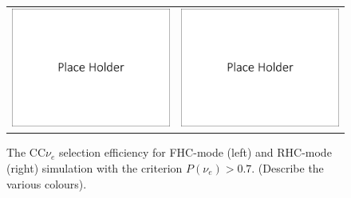 \begin{figure}
    \centering
    \begin{tabular}{cc}
		\includegraphics[scale=0.22]{graphics/cvn_placeholder.pdf} &
		\includegraphics[scale=0.22]{graphics/cvn_placeholder.pdf} 
	\end{tabular}
	\caption{The CC$\nu_e$ selection efficiency for FHC-mode (left) and RHC-mode (right) simulation with the criterion $P(\nu_e) > 0.7$. (Describe the various colours).}
    \label{fig:nueeff}
\end{figure}

